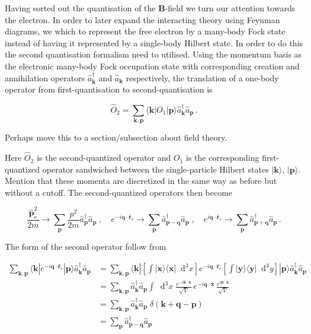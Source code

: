 \documentclass[12pt]{report}
\renewcommand{\vec}[1]{\boldsymbol{\mathbf{#1}}}                        %
\newcommand*\diff{\mathop{}\!\mathrm{d}}
\newcommand{\todo}[1]{{\leavevmode\color{todo}#1}}
\begin{document}
Having sorted out the quantisation of the $ \vec B $-field we turn our attention towards the electron. In order to later expand the interacting theory using Feynman diagrams, we which to represent the free electron by a many-body Fock state instead of having it represented by a single-body Hilbert state. In order to do this the second quantisation formalism need to utilised. Using the momentum basis as the electronic many-body Fock occupation state with corresponding creation and annihilation operators $ \hat a^\dagger_{\vec k} $ and $ \hat a_{\vec k} $ respectively, the translation of a one-body operator from first-quantisation to second-quantisation is\cite{quantumTheoryOfManyParticleSystems}

\begin{equation}
	\hat O_2 = \sum_{\vec k, \vec p} \langle \vec k | O_1 | \vec p \rangle \hat a^\dagger_{\vec k} \hat a_{\vec p} \,.
\end{equation}

\todo{Perhaps move this to a section/subsection about field theory.}

Here $ \hat O_2 $ is the second-quantized operator and $ O_1 $ is the corresponding first-quantized operator sandwiched between the single-particle Hilbert states $ | \vec k \rangle $, $ | \vec p \rangle $. \todo{Mention that these momenta are discretized in the same way as before but without a cutoff}. The second-quantized operators then become

\begin{equation}
	\frac{\hat{\vec p}_\text{e}^2}{2m} \rightarrow \sum_{\vec p} \frac{p^2}{2m} \hat a^\dagger_{\vec p} \hat a_{\vec p}
	\; , \quad
	e^{-i \vec q \cdot \hat{ \vec r}_\text{e}} \rightarrow \sum_{\vec p} \hat a^\dagger_{\vec p - \vec q} \hat a_{\vec p}
	\; , \quad
	e^{i \vec q \cdot \hat{ \vec r}_\text{e}} \rightarrow \sum_{\vec p} \hat a^\dagger_{\vec p + \vec q} \hat a_{\vec p} \,.
\end{equation}

The form of the second operator follow from

\begin{equation}
	\begin{split}
		\sum_{\vec k, \vec p} \langle \vec k | e^{-i \vec q \cdot \hat{ \vec r}_\text{e}} | \vec p \rangle \hat a^\dagger_{\vec k} \hat a_{\vec p}
		& = \sum_{\vec k, \vec p} \langle \vec k |
			\left[ \int | \vec x \rangle \langle \vec x | \diff^3 x \right]
			e^{-i \vec q \cdot \hat{ \vec r}_\text{e}}
			\left[ \int | \vec y \rangle \langle \vec y | \diff^3 y \right]
			| \vec p \rangle \hat a^\dagger_{\vec k} \hat a_{\vec p} \\
		& = \sum_{\vec k, \vec p} \hat a^\dagger_{\vec k} \hat a_{\vec p}
			\int \diff^3 x \;
			\frac{e^{- i \vec k \cdot \vec x}}{\sqrt{V}} \,
			e^{-i \vec q \cdot \vec x} \,
			 \frac{e^{i \vec p \cdot \vec x}}{\sqrt{V}} \\
		& = \sum_{\vec k, \vec p} \hat a^\dagger_{\vec k} \hat a_{\vec p}
			\; \delta( \vec k + \vec q - \vec p) \\
		& = \sum_{\vec p} \hat a^\dagger_{\vec p - \vec q} \hat a_{\vec p}
	\end{split}
\end{equation}
\end{document}
